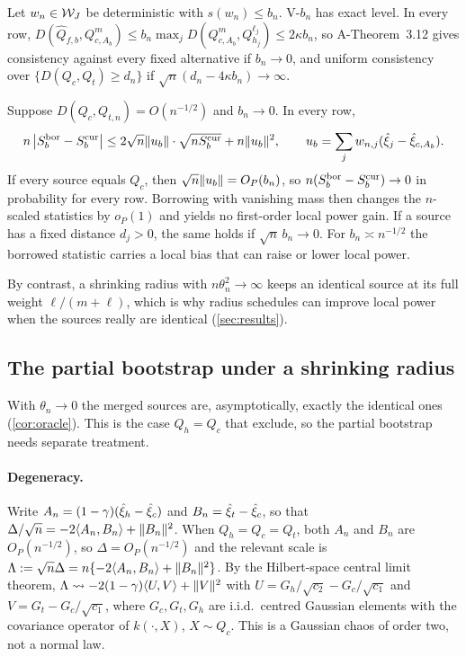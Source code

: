 \documentclass[11pt,a4paper]{article}
\begin{document}
\begin{proposition}\label{prop:mass}
Let $w_n\in\mathcal{W}_J$ be deterministic with $s(w_n)\le b_n$. V-$b_n$ has exact level. In every row, $D(\hat Q_{f,b},Q^m_{c,A_b})\le b_n\max_j D(Q^m_{c,A_b},Q^{\ell_j}_{h_j})\le2\kappa b_n$, so A-Theorem~3.12 gives consistency against every fixed alternative if $b_n\to0$, and uniform consistency over $\{D(Q_c,Q_t)\ge d_n\}$ if $\sqrt n(d_n-4\kappa b_n)\to\infty$.
\end{proposition}

\begin{proposition}\label{prop:nogain}
Suppose $D(Q_c,Q_{t,n})=O(n^{-1/2})$ and $b_n\to0$. In every row,
\[
n\,\big|S^{\rm bor}_b-S^{\rm cur}_b\big|\le 2\sqrt n\lVert u_b\rVert\cdot\sqrt{nS^{\rm cur}_b}+n\lVert u_b\rVert^2,\qquad u_b=\sum_jw_{n,j}(\hat\xi_j-\hat\xi_{c,A_b}).
\]
If every source equals $Q_c$, then $\sqrt n\lVert u_b\rVert=O_P(b_n)$, so $n(S^{\rm bor}_b-S^{\rm cur}_b)\to0$ in probability for every row. Borrowing with vanishing mass then changes the $n$-scaled statistics by $o_P(1)$ and yields no first-order local power gain. If a source has a fixed distance $d_j>0$, the same holds if $\sqrt n\,b_n\to0$. For $b_n\asymp n^{-1/2}$ the borrowed statistic carries a local bias that can raise or lower local power.
\end{proposition}

By contrast, a shrinking radius with $n\theta_n^2\to\infty$ keeps an identical source at its full weight $\ell/(m+\ell)$, which is why radius schedules can improve local power when the sources really are identical (\cref{sec:results}).

\subsection{The partial bootstrap under a shrinking radius}\label{sec:pb}

With $\theta_n\to0$ the merged sources are, asymptotically, exactly the identical ones (\cref{cor:oracle}). This is the case $Q_h=Q_c$ that \citet[Theorem 3.5]{yang2026} exclude, so the partial bootstrap needs separate treatment.

\paragraph{Degeneracy.} Write $A_n=(1-\gamma)(\hat\xi_h-\hat\xi_c)$ and $B_n=\hat\xi_t-\hat\xi_c$, so that $\Delta/\sqrt n=-2\langle A_n, B_n\rangle+\lVert B_n\rVert^2$. When $Q_h=Q_c=Q_t$, both $A_n$ and $B_n$ are $O_P(n^{-1/2})$, so $\Delta=O_P(n^{-1/2})$ and the relevant scale is $\Lambda:=\sqrt n\Delta=n\{-2\langle A_n, B_n\rangle+\lVert B_n\rVert^2\}$. By the Hilbert-space central limit theorem, $\Lambda\rightsquigarrow-2(1-\gamma)\langle U, V\rangle+\lVert V\rVert^2$ with $U=G_h/\sqrt{c_2}-G_c/\sqrt{c_1}$ and $V=G_t-G_c/\sqrt{c_1}$, where $G_c,G_t,G_h$ are i.i.d.\ centred Gaussian elements with the covariance operator of $k(\cdot,X)$, $X\sim Q_c$. This is a Gaussian chaos of order two, not a normal law.
\end{document}
